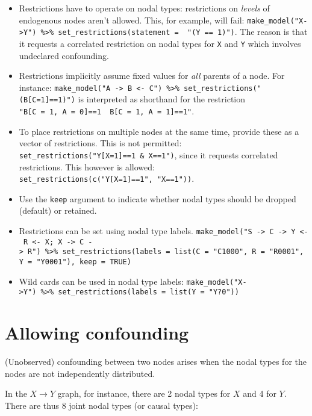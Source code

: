 \documentclass[
  12pt,
]{book}
\providecommand{\tightlist}{%
  \setlength{\itemsep}{0pt}\setlength{\parskip}{0pt}}
\begin{document}
\begin{itemize}
\tightlist
\item
  Restrictions have to operate on nodal types: restrictions on \emph{levels} of endogenous nodes aren't allowed. This, for example, will fail:
  \texttt{make\_model("X-\textgreater{}Y")\ \%\textgreater{}\%\ set\_restrictions(statement\ =\ \ "(Y\ ==\ 1)")}. The reason is that it requests a correlated restriction on nodal types for \texttt{X} and \texttt{Y} which involves undeclared confounding.
\item
  Restrictions implicitly assume fixed values for \emph{all} parents of a node. For instance: \texttt{make\_model("A\ -\textgreater{}\ B\ \textless{}-\ C")\ \%\textgreater{}\%\ set\_restrictions("(B{[}C=1{]}==1)")} is interpreted as shorthand for the restriction \texttt{"B{[}C\ =\ 1,\ A\ =\ 0{]}==1\ \textbar{}\ B{[}C\ =\ 1,\ A\ =\ 1{]}==1"}.
\item
  To place restrictions on multiple nodes at the same time, provide these as a vector of restrictions. This is not permitted: \texttt{set\_restrictions("Y{[}X=1{]}==1\ \&\ X==1")}, since it requests correlated restrictions. This however is allowed: \texttt{set\_restrictions(c("Y{[}X=1{]}==1",\ "X==1"))}.\\
\item
  Use the \texttt{keep} argument to indicate whether nodal types should be dropped (default) or retained.
\item
  Restrictions can be set using nodal type labels. \texttt{make\_model("S\ -\textgreater{}\ C\ -\textgreater{}\ Y\ \textless{}-\ R\ \textless{}-\ X;\ X\ -\textgreater{}\ C\ -\textgreater{}\ R")\ \%\textgreater{}\%\ set\_restrictions(labels\ =\ list(C\ =\ "C1000",\ R\ =\ "R0001",\ Y\ =\ "Y0001"),\ keep\ =\ TRUE)}
\item
  Wild cards can be used in nodal type labels: \texttt{make\_model("X-\textgreater{}Y")\ \%\textgreater{}\%\ set\_restrictions(labels\ =\ list(Y\ =\ "Y?0"))}
\end{itemize}

\hypertarget{confounding}{%
\section{Allowing confounding}\label{confounding}}

(Unobserved) confounding between two nodes arises when the nodal types for the nodes are not independently distributed.

In the \(X \rightarrow Y\) graph, for instance, there are 2 nodal types for \(X\) and 4 for \(Y\). There are thus 8 joint nodal types (or causal types):
\end{document}
